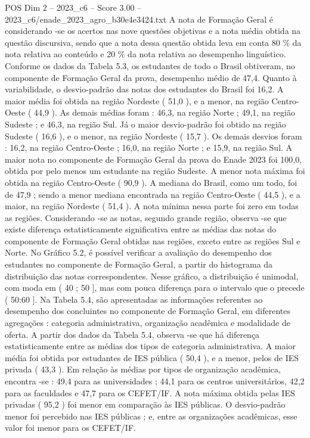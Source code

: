 \begin{textsample}{POS Dim 2 – 2023\_c6 – Score 3.00 – 2023\_c6/enade\_2023\_agro\_b30e4e3424.txt}
A nota de Formação Geral é considerando -se os acertos nas nove questões objetivas e a nota média obtida na questão discursiva, sendo que a nota dessa questão obtida leva em conta 80 \% da nota relativa ao conteúdo e 20 \% da nota relativa ao desempenho linguístico.
Conforme os dados da Tabela 5.3, os estudantes de todo o Brasil obtiveram, no componente de Formação Geral da prova, desempenho médio de 47,4.
Quanto à variabilidade, o desvio-padrão das notas dos estudantes do Brasil foi 16,2.
A maior média foi obtida na região Nordeste ( 51,0 ), e a menor, na região Centro-Oeste ( 44,9 ).
As demais médias foram : 46,3, na região Norte ; 49,1, na região Sudeste ; e 46,3, na região Sul.
Já o maior desvio-padrão foi obtido na região Sudeste ( 16,6 ), e o menor, na região Nordeste ( 15,7 ).
Os demais desvios foram : 16,2, na região Centro-Oeste ; 16,0, na região Norte ; e 15,9, na região Sul.
A maior nota no componente de Formação Geral da prova do Enade 2023 foi 100,0, obtida por pelo menos um estudante na região Sudeste.
A menor nota máxima foi obtida na região Centro-Oeste ( 90,9 ).
A mediana do Brasil, como um todo, foi de 47,9 ; sendo a menor mediana encontrada na região Centro-Oeste ( 44,5 ), e a maior, na região Nordeste ( 51,4 ).
A nota mínima nessa parte foi zero em todas as regiões.
Considerando -se as notas, segundo grande região, observa -se que existe diferença estatisticamente significativa entre as médias das notas do componente de Formação Geral obtidas nas regiões, exceto entre as regiões Sul e Norte.
No Gráfico 5.2, é possível verificar a avaliação do desempenho dos estudantes no componente de Formação Geral, a partir do histograma da distribuição das notas correspondentes.
Nesse gráfico, a distribuição é unimodal, com moda em ( 40 ; 50 ], mas com pouca diferença para o intervalo que o precede ( 50:60 ].
Na Tabela 5.4, são apresentadas as informações referentes ao desempenho dos concluintes no componente de Formação Geral, em diferentes agregações : categoria administrativa, organização acadêmica e modalidade de oferta.
A partir dos dados da Tabela 5.4, observa -se que há diferença estatisticamente entre as médias dos tipos de categoria administrativa.
A maior média foi obtida por estudantes de IES pública ( 50,4 ), e a menor, pelos de IES privada ( 43,3 ).
Em relação às médias por tipos de organização acadêmica, encontra -se : 49,4 para as universidades ; 44,1 para os centros universitários, 42,2 para as faculdades e 47,7 para os CEFET/IF.
A nota máxima obtida pelas IES privadas ( 95,2 ) foi menor em comparação às IES públicas.
O desvio-padrão menor foi percebido nas IES públicas ; e, entre as organizações acadêmicas, esse valor foi menor para os CEFET/IF.

\end{textsample}

